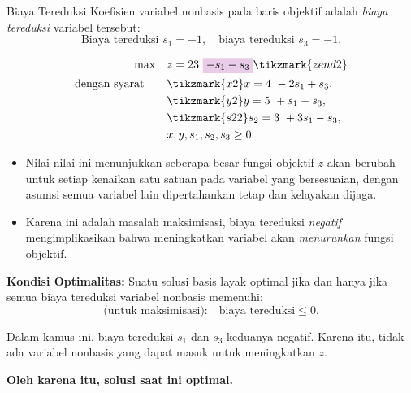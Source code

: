 \begin{remark}{Biaya Tereduksi}\label{def:reduced-cost}
Koefisien variabel nonbasis pada baris objektif adalah \emph{biaya tereduksi} variabel tersebut:
\[
\text{Biaya tereduksi } s_1 = -1, \quad \text{biaya tereduksi } s_3 = -1.
\]

\[
\begin{aligned}
\max \quad 
& z = 23~ \text{\colorbox{purple!20!white}{$- s_1 - s_3$}} \tikzmark{zend2} \\
\st \quad 
& \tikzmark{x2} x = 4 ~ - 2s_1 + s_3, \\
& \tikzmark{y2} y = 5 ~ + s_1 - s_3, \\
& \tikzmark{s22} s_2 = 3~ + 3s_1 - s_3, \\
& x, y, s_1, s_2, s_3 \ge 0.
\end{aligned}
\]


\bigskip

\begin{itemize}
    \item Nilai-nilai ini menunjukkan seberapa besar fungsi objektif \( z \) akan berubah untuk setiap kenaikan satu satuan pada variabel yang bersesuaian, dengan asumsi semua variabel lain dipertahankan tetap dan kelayakan dijaga.
    \item Karena ini adalah masalah maksimisasi, biaya tereduksi \emph{negatif} mengimplikasikan bahwa meningkatkan variabel akan \emph{menurunkan} fungsi objektif.
\end{itemize}

\medskip

\noindent\textbf{Kondisi Optimalitas:}  
Suatu solusi basis layak optimal jika dan hanya jika semua biaya tereduksi variabel nonbasis memenuhi:
\[
\text{(untuk maksimisasi):} \quad \text{biaya tereduksi} \le 0.
\]

\medskip

Dalam kamus ini, biaya tereduksi \(s_1\) dan \(s_3\) keduanya negatif.
Karena itu, tidak ada variabel nonbasis yang dapat masuk untuk meningkatkan \(z\).

\textbf{Oleh karena itu, solusi saat ini optimal.}
\end{remark}

